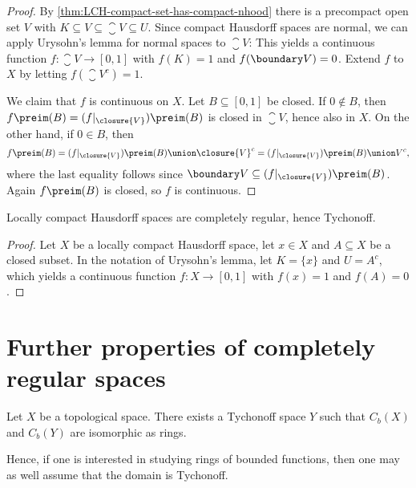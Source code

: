 \documentclass[article, a4paper, 11pt, oneside]{memoir}
\numberwithin{equation}{chapter}
\newcommand{\calT}{\mathcal{T}}
\begin{document}
\begin{proof}
    By \cref{thm:LCH-compact-set-has-compact-nhood} there is a precompact open set $V$ with $K \subseteq V \subseteq \closure{V} \subseteq U$. Since compact Hausdorff spaces are normal, we can apply Urysohn's lemma for normal spaces to $\closure{V}$: This yields a continuous function $f \colon \closure{V} \to [0,1]$ with $f(K) = 1$ and $f(\boundary V) = 0$. Extend $f$ to $X$ by letting $f(\closure{V}^c) = 1$.

    We claim that $f$ is continuous on $X$. Let $B \subseteq [0,1]$ be closed. If $0 \not\in B$, then $f\preim(B) = (f|_{\closure{V}})\preim(B)$ is closed in $\closure{V}$, hence also in $X$. On the other hand, if $0 \in B$, then
    \begin{equation*}
        f\preim(B)
            = (f|_{\closure{V}})\preim(B) \union \closure{V}^c
            = (f|_{\closure{V}})\preim(B) \union V^c,
    \end{equation*}
    where the last equality follows since $\boundary V \subseteq (f|_{\closure{V}})\preim(B)$. Again $f\preim(B)$ is closed, so $f$ is continuous.
\end{proof}


\begin{corollary}
    Locally compact Hausdorff spaces are completely regular, hence Tychonoff.
\end{corollary}

\begin{proof}
    Let $X$ be a locally compact Hausdorff space, let $x \in X$ and $A \subseteq X$ be a closed subset. In the notation of Urysohn's lemma, let $K = \{x\}$ and $U = A^c$, which yields a continuous function $f \colon X \to [0,1]$ with $f(x) = 1$ and $f(A) = 0$.
\end{proof}


\section{Further properties of completely regular spaces}


\begin{proposition}
    Let $X$ be a topological space. There exists a Tychonoff space $Y$ such that $C_b(X)$ and $C_b(Y)$ are isomorphic as rings.
\end{proposition}
%
Hence, if one is interested in studying rings of bounded functions, then one may as well assume that the domain is Tychonoff.
\end{document}
